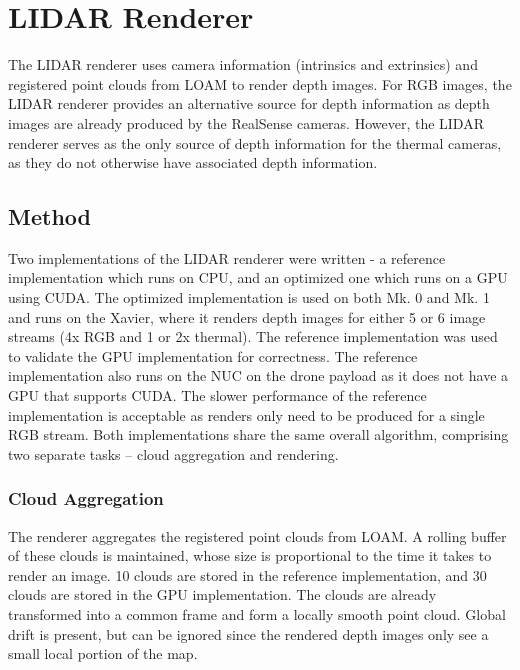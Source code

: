 \section{LIDAR Renderer}

The LIDAR renderer uses camera information (intrinsics and extrinsics) and registered point clouds from LOAM to render depth images. For RGB images, the LIDAR renderer provides an alternative source for depth information as depth images are already produced by the RealSense cameras. However, the LIDAR renderer serves as the only source of depth information for the thermal cameras, as they do not otherwise have associated depth information.

\subsection{Method}

Two implementations of the LIDAR renderer were written - a reference implementation which runs on CPU, and an optimized one which runs on a GPU using CUDA. The optimized implementation is used on both Mk. 0 and Mk. 1 and runs on the Xavier, where it renders depth images for either 5 or 6 image streams (4x RGB and 1 or 2x thermal). The reference implementation was used to validate the GPU implementation for correctness. The reference implementation also runs on the NUC on the drone payload as it does not have a GPU that supports CUDA. The slower performance of the reference implementation is acceptable as renders only need to be produced for a single RGB stream. Both implementations share the same overall algorithm, comprising two separate tasks -- cloud aggregation and rendering.

\subsubsection{Cloud Aggregation}
The renderer aggregates the registered point clouds from LOAM. A rolling buffer of these clouds is maintained, whose size is proportional to the time it takes to render an image. 10 clouds are stored in the reference implementation, and 30 clouds are stored in the GPU implementation. The clouds are already transformed into a common frame and form a locally smooth point cloud. Global drift is present, but can be ignored since the rendered depth images only see a small local portion of the map.

